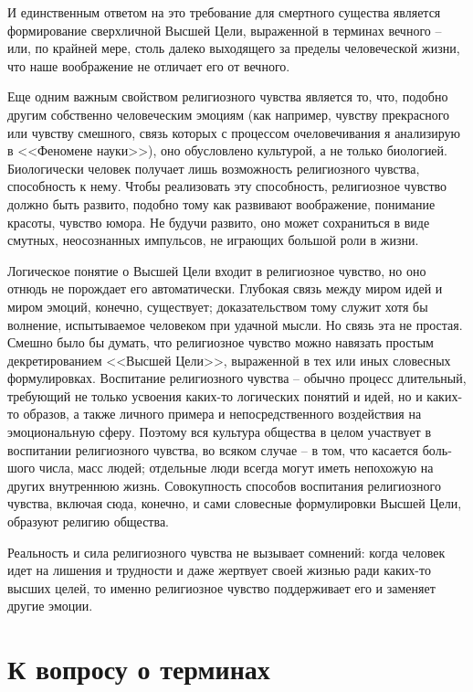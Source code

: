 \documentclass{book}
\begin{document}
И единственным ответом на это требование для смертного су­щества является формирование сверхличной Высшей Цели, выраженной в терминах вечного -- или, по крайней мере, столь далеко выходящего за пределы человеческой жизни, что наше воображение не отличает его от вечного.

Еще одним важным свойством религиозного чувства являет­ся то, что, подобно другим собственно человеческим эмоциям (как например, чувству прекрасного или чувству смешного, связь которых с процессом очеловечивания я анализирую в <<Феномене науки>>), оно обусловлено культурой,  а не только биологией. Биологически человек получает лишь возможность религиозного чувства, способность  к нему. Чтобы реализовать эту способность, религиозное чувство должно быть развито, подобно тому как развивают воображение, понимание красоты, чувство юмора. Не будучи развито, оно может сохраниться в виде смутных, неосознанных импульсов, не играющих большой роли в жизни.

Логическое понятие о Высшей Цели входит в религиозное чувство, но оно отнюдь не порождает его автоматически. Глубокая связь между миром идей и миром эмоций, конечно, существует; доказательством тому служит хотя бы волнение, испытываемое человеком при удачной мысли. Но связь эта не простая. Смешно было бы думать, что религиозное чувство можно навязать простым декретированием <<Высшей Цели>>, выраженной в тех или иных словесных формулировках. Воспитание религиозного чувства -- обычно процесс длительный, требующий не только усвоения каких-то логических понятий и идей, но и каких-то образов,  а также личного примера и непосредственного воздействия на эмоциональную сферу. Поэтому вся культура общества в целом участвует в воспитании религиозного чувства, во всяком случае -- в том, что касается боль­шого числа, масс людей; отдельные люди всегда могут иметь непохожую на других внутреннюю жизнь. Совокупность способов воспитания религиозного чувства, включая сюда, конечно, и сами словесные формулировки Высшей Цели, 
образуют рели­гию  общества.

Реальность и сила религиозного чувства не вызывает сомне­ний: когда человек идет на лишения и трудности и даже жертвует своей жизнью ради каких-то высших целей, то именно религиозное чувство поддерживает его и заменяет другие эмоции.


\section{К вопросу о терминах}
\end{document}
